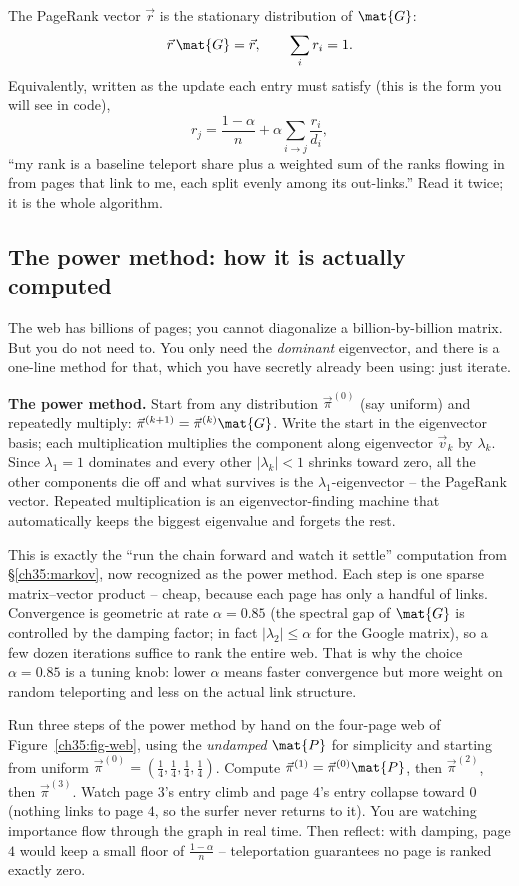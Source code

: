 The PageRank vector $\vec{r}$ is the stationary distribution of $\mat{G}$:
\[
\vec{r}\,\mat{G} = \vec{r}, \qquad \sum_i r_i = 1.
\]
Equivalently, written as the update each entry must satisfy (this is the form you will see
in code),
\[
r_j = \frac{1-\alpha}{n} + \alpha \sum_{i \to j} \frac{r_i}{d_i},
\]
``my rank is a baseline teleport share plus a weighted sum of the ranks flowing in from
pages that link to me, each split evenly among its out-links.'' Read it twice; it is the
whole algorithm.

\subsection{The power method: how it is actually computed}

The web has billions of pages; you cannot diagonalize a billion-by-billion matrix. But you
do not need to. You only need the \emph{dominant} eigenvector, and there is a one-line
method for that, which you have secretly already been using: just iterate.

\begin{intuitionbox}
\textbf{The power method.} Start from any distribution $\vec\pi^{(0)}$ (say uniform) and
repeatedly multiply: $\vec\pi^{(k+1)} = \vec\pi^{(k)}\mat{G}$. Write the start in the
eigenvector basis; each multiplication multiplies the component along eigenvector
$\vec{v}_k$ by $\lambda_k$. Since $\lambda_1 = 1$ dominates and every other $|\lambda_k| < 1$
shrinks toward zero, all the other components die off and what survives is the
$\lambda_1$-eigenvector -- the PageRank vector. Repeated multiplication is an
eigenvector-finding machine that automatically keeps the biggest eigenvalue and forgets the
rest.
\end{intuitionbox}

This is exactly the ``run the chain forward and watch it settle'' computation from
\S\ref{ch35:markov}, now recognized as the power method. Each step is one sparse
matrix--vector product -- cheap, because each page has only a handful of links. Convergence
is geometric at rate $\alpha = 0.85$ (the spectral gap of $\mat{G}$ is controlled by the
damping factor; in fact $|\lambda_2| \le \alpha$ for the Google matrix), so a few dozen
iterations suffice to rank the entire web. That is why the choice $\alpha = 0.85$ is a
tuning knob: lower $\alpha$ means faster convergence but more weight on random teleporting
and less on the actual link structure.

\begin{labbox}
Run three steps of the power method by hand on the four-page web of
Figure~\ref{ch35:fig-web}, using the \emph{undamped} $\mat{P}$ for simplicity and starting
from uniform $\vec\pi^{(0)} = (\tfrac14,\tfrac14,\tfrac14,\tfrac14)$. Compute
$\vec\pi^{(1)} = \vec\pi^{(0)}\mat{P}$, then $\vec\pi^{(2)}$, then $\vec\pi^{(3)}$. Watch
page $3$'s entry climb and page $4$'s entry collapse toward $0$ (nothing links to page $4$,
so the surfer never returns to it). You are watching importance flow through the graph in
real time. Then reflect: with damping, page $4$ would keep a small floor of
$\tfrac{1-\alpha}{n}$ -- teleportation guarantees no page is ranked exactly zero.
\end{labbox}


